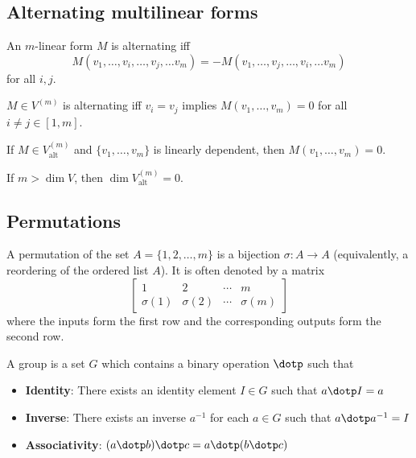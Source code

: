\subsection{Alternating multilinear forms}

\begin{definition}
  An $m$-linear form $M$ is alternating iff
  \[
    M(v_1, \ldots, v_i, \ldots, v_j, \ldots v_m) = -M(v_1, \ldots, v_j, \ldots, v_i, \ldots v_m)
  \]
  for all $i, j$. 
\end{definition}

\begin{lemma}
  $M \in V^{(m)}$ is alternating iff $v_i = v_j$ implies $M(v_1, \ldots, v_m) = 0$ for all $i \neq j \in [1, m]$.
\end{lemma}

\begin{lemma}
  If $M \in V^{(m)}_{\text{alt}}$ and $\{ v_1, \ldots, v_m \}$ is linearly dependent, then $M(v_1, \ldots, v_m) = 0$.
\end{lemma}

\begin{lemma}
  If $m > \dim V$, then $\dim V^{(m)}_{\text{alt}} = 0$.
\end{lemma}

\subsection{Permutations}

\begin{definition}[Permutation]
  A permutation of the set $A = \{1, 2, \ldots, m\}$ is a bijection $\sigma : A \to A$ (equivalently, a reordering of the ordered list $A$). It is often denoted by a matrix
  \[
    \begin{bmatrix}
      1 & 2 & \cdots & m \\
      \sigma(1) & \sigma(2) & \cdots & \sigma(m)
    \end{bmatrix}
  \]
  where the inputs form the first row and the corresponding outputs form the second row.
\end{definition}

\begin{definition}[Group]
  A group is a set $G$ which contains a binary operation $\dotp$ such that
  \begin{itemize}
    \item \textbf{Identity}: There exists an identity element $I \in G$ such that $a \dotp I = a$
    \item \textbf{Inverse}: There exists an inverse $a^{-1}$ for each $a \in G$ such that $a \dotp a^{-1} = I$
    \item \textbf{Associativity}: $(a \dotp b) \dotp c = a \dotp (b \dotp c)$
  \end{itemize}
\end{definition}

